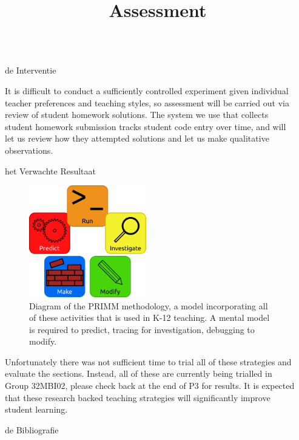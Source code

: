 \documentclass[final]{beamer}
\newlength{\sepwidth}
\newlength{\colwidth}
\newcommand{\separatorcolumn}{\begin{column}{\sepwidth}\end{column}}
\begin{document}
\begin{frame}[t,fragile]
\begin{columns}[t]
\begin{column}{\colwidth}
\begin{exampleblock}{de Interventie}
    \title{Assessment}

      It is difficult to conduct a sufficiently controlled experiment given individual teacher preferences and teaching styles, so assessment will be carried out via review of student homework solutions. The system we use that collects student homework submission tracks student code entry over time, and will let us review how they attempted solutions and let us make qualitative observations.

  \end{exampleblock}

  \begin{block}{het Verwachte Resultaat}
    \begin{figure}
\centering
      \includegraphics[width=0.48\textwidth]{./primm.png}
          \caption{Diagram of the PRIMM methodology\cite{Sentance_2017}, a model incorporating all of these activities that is used in K-12 teaching. A mental model is required to predict, tracing for investigation, debugging to modify.\label{fig:primm}}
\end{figure}
    Unfortunately there was not sufficient time to trial all of these strategies and evaluate the sections. Instead, all of these are currently being trialled in Group 32MBI02, please check back at the end of P3 for results. It is expected that these research backed teaching strategies will significantly improve student learning.
      \vspace{8em}


  \end{block}

  \begin{block}{de Bibliografie}
    \nocite{*}
    \footnotesize{}

  \end{block}

\end{column}

\separatorcolumn
\end{columns}
\end{frame}
\end{document}
